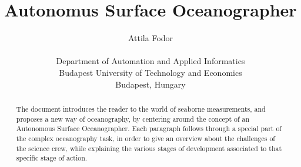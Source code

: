 \documentclass{article}
\begin{document}
	\begin{titlepage}

	\title{Autonomus Surface Oceanographer}
	\author{Attila Fodor \\\\ Department of Automation and Applied Informatics\\
Budapest University of Technology and Economics\\
Budapest, Hungary}

	\maketitle
	\thispagestyle{empty}

	\begin{abstract}
		The document introduces the reader to the world of seaborne measurements, and proposes a new way of 		oceanography, by centering around the concept of an Autonomous Surface Oceanographer. Each paragraph 		follows through a special part of the complex oceanography task, in order to give an overview about 		the challenges of the science crew, while explaining the various stages of development associated to 		that specific stage of action.
	\end{abstract}

\end{titlepage}







\end{document}
